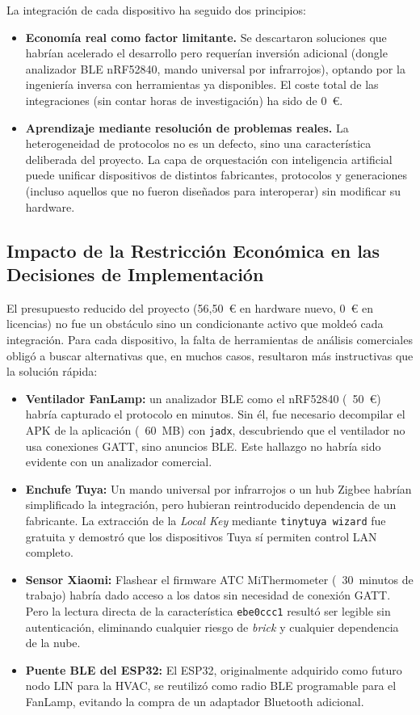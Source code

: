 La integración de cada dispositivo ha seguido dos principios:

\begin{itemize}
    \item \textbf{Economía real como factor limitante.} Se descartaron soluciones que habrían acelerado el desarrollo pero requerían inversión adicional (dongle analizador BLE nRF52840, mando universal por infrarrojos), optando por la ingeniería inversa con herramientas ya disponibles. El coste total de las integraciones (sin contar horas de investigación) ha sido de 0~\euro{}.
    \item \textbf{Aprendizaje mediante resolución de problemas reales.} La heterogeneidad de protocolos no es un defecto, sino una característica deliberada del proyecto. La capa de orquestación con inteligencia artificial puede unificar dispositivos de distintos fabricantes, protocolos y generaciones (incluso aquellos que no fueron diseñados para interoperar) sin modificar su hardware.
\end{itemize}

\subsection{Impacto de la Restricción Económica en las Decisiones de Implementación}
\label{sec:impacto_economico}

El presupuesto reducido del proyecto (56,50~\euro{} en hardware nuevo, 0~\euro{} en licencias) no fue un obstáculo sino un condicionante activo que moldeó cada integración. Para cada dispositivo, la falta de herramientas de análisis comerciales obligó a buscar alternativas que, en muchos casos, resultaron más instructivas que la solución rápida:

\begin{itemize}
    \item \textbf{Ventilador FanLamp:} un analizador BLE como el nRF52840 (~50~\euro{}) habría capturado el protocolo en minutos. Sin él, fue necesario decompilar el APK de la aplicación (~60~MB) con \texttt{jadx}, descubriendo que el ventilador no usa conexiones GATT, sino anuncios BLE. Este hallazgo no habría sido evidente con un analizador comercial.
    \item \textbf{Enchufe Tuya:} Un mando universal por infrarrojos o un hub Zigbee habrían simplificado la integración, pero hubieran reintroducido dependencia de un fabricante. La extracción de la \textit{Local Key} mediante \texttt{tinytuya wizard} fue gratuita y demostró que los dispositivos Tuya sí permiten control LAN completo.
    \item \textbf{Sensor Xiaomi:} Flashear el firmware ATC MiThermometer (~30~minutos de trabajo) habría dado acceso a los datos sin necesidad de conexión GATT. Pero la lectura directa de la característica \texttt{ebe0ccc1} resultó ser legible sin autenticación, eliminando cualquier riesgo de \textit{brick} y cualquier dependencia de la nube.
    \item \textbf{Puente BLE del ESP32:} El ESP32, originalmente adquirido como futuro nodo LIN para la HVAC, se reutilizó como radio BLE programable para el FanLamp, evitando la compra de un adaptador Bluetooth adicional.
\end{itemize}

